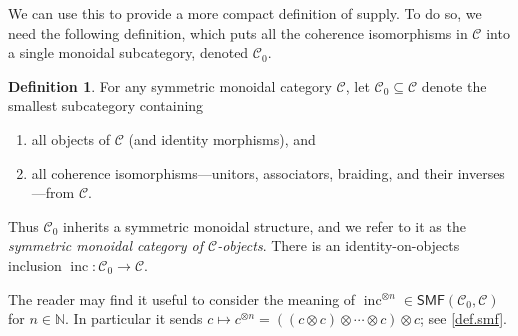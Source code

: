 \documentclass[11pt, oneside, article]{memoir}
\theoremstyle{plain}
\theoremstyle{definition}
\newtheorem{definition}[theorem]{Definition}
\theoremstyle{remark}
\newcommand{\cat}[1]{\mathcal{#1}}%
\newcommand{\Cat}[1]{{\mathsf{#1}}}%
\DeclareMathOperator{\inc}{inc}
\newcommand{\tpow}[1]{^{\otimes #1}}
\newcommand{\smf}{\Cat{SMF}}
\newcommand{\nn}{\mathbb{N}}
\newcommand{\mob}[1]{#1_0}
\renewcommand{\ss}{\subseteq}
\begin{document}
We can use this to provide a more compact definition of supply. To do so, we need the following definition, which puts all the coherence isomorphisms in $\cat{C}$ into a single monoidal subcategory, denoted $\mob{\cat{C}}$.

\begin{definition}\label{def.mob}
For any symmetric monoidal category $\cat{C}$, let $\mob{\cat{C}}\ss\cat{C}$ denote the smallest subcategory containing
\begin{enumerate}[label=(\roman*)]
	\item all objects of $\cat{C}$ (and identity morphisms), and
	\item all coherence isomorphisms---unitors, associators, braiding, and their inverses---from $\cat{C}$.
\end{enumerate}
Thus $\mob{\cat{C}}$ inherits a symmetric monoidal structure, and we refer to it as the \emph{symmetric monoidal category of $\cat{C}$-objects}. There is an identity-on-objects inclusion $\inc\colon\mob{\cat{C}}\to\cat{C}$. 
\end{definition}

The reader may find it useful to consider the meaning of $\inc\tpow{n}\in\smf(\mob{\cat{C}},\cat{C})$ for $n\in\nn$. In particular it sends $c\mapsto c\tpow{n}=((c\otimes c)\otimes\cdots\otimes c)\otimes c$; see \cref{def.smf}.
\end{document}
